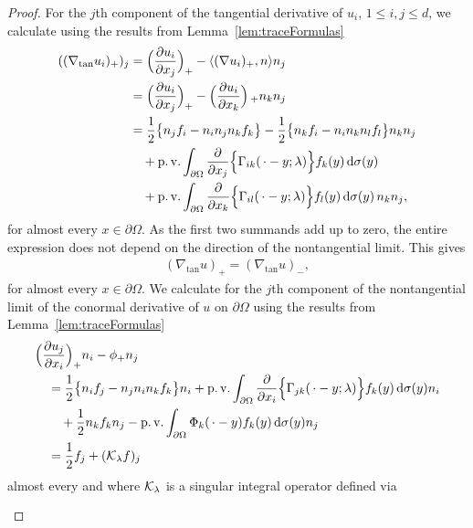 \begin{proof}
  For the $j$th component of the tangential derivative of $u_i$, $1\leq i,j \leq d$, we calculate using the results from Lemma~\ref{lem:traceFormulas}
  \begin{align*}
    ((\nabla_{\mathrm{tan}} u_i)_+)_j
    &= \Big(\frac{\partial u_i}{\partial x_j}\Big)_+ - \langle (\nabla u_i)_+, n \rangle n_j \\
    &= \Big(\frac{\partial u_i}{\partial x_j} \Big)_+ - \Big(\frac{\partial u_i}{\partial x_k} \Big)\,_+ n_k n_j \\
    &= \frac{1}{2} \big\{ n_j f_i - n_i n_j n_k f_k\big\} - \frac{1}{2} \big\{ n_k f_i - n_i n_k n_l f_l \big\} n_k n_j  \\
    &\quad+ \operatorname{p. v.} \int_{\partial\Omega} \frac{\partial}{\partial x_j} \Big\{ \Gamma_{ik} (\,\cdot - y; \lambda) \Big\} f_k(y) \, {\operatorname{d}\!{\sigma}}(y) \\
    &\quad+ \operatorname{p. v.} \int_{\partial\Omega} \frac{\partial}{\partial x_k} \Big\{ \Gamma_{il} (\,\cdot - y; \lambda) \Big\} f_l(y) \, {\operatorname{d}\!{\sigma}}(y) \, n_k n_j,
  \end{align*}
  for almost every $x \in \partial\Omega$.
  As the first two summands add up to zero, the entire expression does not depend on the direction of the nontangential limit. 
  This gives
  \begin{align*}
    (\nabla_{\mathrm{tan}} u)_+ = (\nabla_{\mathrm{tan}} u)_-,
  \end{align*}
  for almost every $x \in \partial\Omega$.
  We calculate for the $j$th component of the nontangential limit of the conormal derivative of $u$ on $\partial\Omega$ using the results from Lemma~\ref{lem:traceFormulas}
  \begin{align*}
    &\Big(\frac{\partial u_j}{\partial x_i}\Big)_+ n_i - \phi_+ n_j\\
    &\quad= \frac{1}{2} \big\{ n_i f_j - n_j n_i n_k f_k \big\} n_i + \operatorname{p. v.} \int_{\partial\Omega} \frac{\partial}{\partial{x_i}} \Big\{ \Gamma_{jk}(\,\cdot - y; \lambda) \Big\} f_k(y) \, {\operatorname{d}\!{\sigma}}(y) n_i \\
    &\qquad+ \frac{1}{2} n_k f_k n_j - \operatorname{p. v.} \int_{\partial\Omega} \Phi_k(\,\cdot - y) f_k(y) \, {\operatorname{d}\!{\sigma}}(y) n_j \\
    &\quad= \frac{1}{2} f_j + (\mathcal{K}_\lambda f)_j
  \end{align*}
  almost every and where $\mathcal{K}_\lambda$ is a singular integral operator defined via
  \begin{align}
    \label{eq:defnKlambda}
    \begin{alignedat}{1}

\end{alignedat}
\end{align}
\end{proof}

